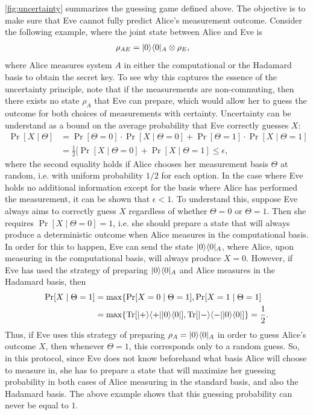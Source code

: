 \autoref{fig:uncertainty} summarizes the guessing game defined above. The objective is to make sure that Eve cannot fully predict Alice’s measurement outcome. Consider the following example, where the joint state between Alice and Eve is 
\begin{align*}
    \rho_{A E} 
    &= |0 \rangle \langle 0|_{A} \otimes \rho_{E},
\end{align*}
where Alice measures system $A$ in either the computational or the Hadamard basis to obtain the secret key. 
To see why this captures the essence of the uncertainty principle, note that if the measurements are non-commuting, then there exists no state $\rho_{A}$ that Eve can prepare, which would allow her to guess the outcome for both choices of measurements with certainty. Uncertainty can be understand as  a bound on the average probability that Eve correctly guesses $X$:
\begin{align*}
    \Pr[X \mid \Theta] 
    &= \Pr[\Theta = 0] \cdot \Pr[X \mid \Theta = 0] + 
    \Pr[\Theta = 1] \cdot \Pr[X \mid \Theta = 1] \\
    &= \frac{1}{2} [\Pr[X \mid \Theta = 0] + \Pr[X \mid \Theta = 1]\le \epsilon,
\end{align*}
where the second equality holds if Alice chooses her measurement basis $\Theta$ at random, i.e. with uniform probability $1 / 2$ for each option. In the case where Eve holds no additional information except for the basis where Alice has performed the measurement, it can be shown that $\epsilon < 1$. To understand this, suppose Eve always aims to correctly guess $X$ regardless of whether $\Theta = 0$ or $\Theta = 1$. Then she requires $\Pr[X \mid \Theta = 0] = 1$, i.e. she should prepare a state that will always produce a deterministic outcome when Alice measures in the computational basis. In order for this to happen, Eve can send the state $|0 \rangle \langle 0|_{A}$, where Alice, upon measuring in the computational basis, will always produce $X = 0$. However, if Eve has used the strategy of preparing $|0 \rangle \langle 0|_{A}$ and Alice measures in the Hadamard basis, then
\begin{align*}
    \Pr[X \mid \Theta = 1] 
    &= \max\{\Pr[X = 0 \mid \Theta = 1], \Pr[X = 1 \mid \Theta = 1] \\
    &= \max\{\operatorname{Tr}[|+ \rangle \langle +| |0 \rangle \langle 0|], \operatorname{Tr}[|- \rangle \langle -| |0 \rangle \langle 0|]\}= \frac{1}{2}. 
\end{align*}
Thus, if Eve uses this strategy of preparing $\rho_{A} = |0 \rangle \langle 0|_{A}$ in order to guess Alice’s outcome $X$, then whenever $\Theta = 1$, this corresponds only to a random guess. So, in this protocol, since Eve does not know beforehand what basis Alice will choose to measure in, she has to prepare a state that will maximize her guessing probability in both cases of Alice measuring in the standard basis, and also the Hadamard basis. The above example shows that this guessing probability can never be equal to $1$.

